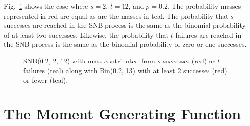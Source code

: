 \documentclass[review]{elsarticle}
\begin{document}
Fig.~\ref{fig:snb_bin_compare} shows the case
where $s=2$, $t=12$, and $p=0.2$. The probability masses represented in
red are equal as are the masses in teal. The probability that $s$
successes are reached in the SNB process is the same as the binomial 
probability of at least two successes. Likewise, the probability that $t$ 
failures are reached in the SNB process is the same as the binomial
probability of zero or one successes.

\begin{figure}[t!]
\centering
{}
\hfill
{}
\caption{
SNB(0.2, 2, 12) with mass contributed from 
$s$ successes (red) or $t$ failures (teal) along with Bin(0.2, 13) with
at least 2 successes (red) or fewer (teal).
}
\label{fig:snb_bin_compare}
\end{figure}


\section{The Moment Generating Function}
\end{document}
